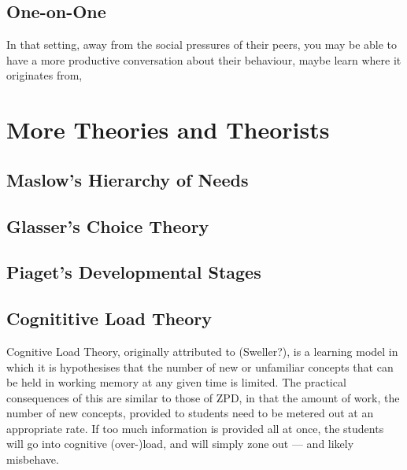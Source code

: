 \documentclass[12pt]{report}
\begin{document}
\begin{appendices}
\section{One-on-One}

In that setting, away from the social pressures of their peers, you may be able to have a more productive conversation about their behaviour, maybe learn where it originates from,




\chapter{More Theories and Theorists}


\section{Maslow's Hierarchy of Needs}


\section{Glasser's Choice Theory}


\section{Piaget's Developmental Stages}


\section{Cognititive Load Theory}

Cognitive Load Theory, originally attributed to (Sweller?), is a learning model in which it is hypothesises that the number of new or unfamiliar concepts that can be held in working memory at any given time is limited. The practical consequences of this are similar to those of ZPD, in that the amount of work, the number of new concepts, provided to students need to be metered out at an appropriate rate. If too much information is provided all at once, the students will go into cognitive (over-)load, and will simply zone out --- and likely misbehave.


\end{appendices}

{}

\end{document}
